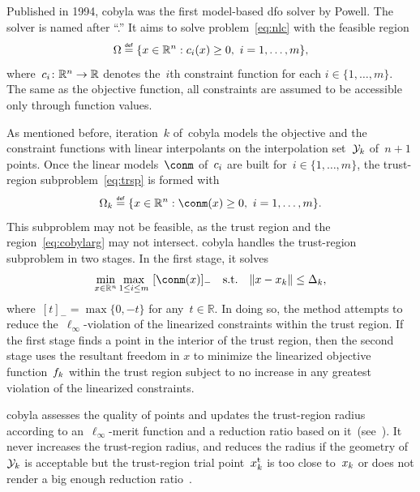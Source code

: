 \documentclass[
    smallextended,  %
    final,          %
]{svjour3}
\newcommand{\norm}[2][]{#1\lVert#2#1\rVert}
\newcommand{\set}[2][]{#1\{#2#1\}}
\newcommand{\R}{\mathbb{R}}
\newcommand{\st}{\text{s.t.}}
\newcommand{\trust}{{\text{t}}}
\newcommand{\con}[1][i]{c\ifthenelse{\equal{#1}{}}{}{_{#1}}}
\newcommand{\eqdef}{\stackrel{\mathsmaller{\mathsf{def}}}{=}}
\newcommand{\fsetm}[1][k]{\Omega_{#1}}
\newcommand{\fset}{\Omega}
\newcommand{\iter}[1][k]{x\ifthenelse{\equal{#1}{}}{}{_{#1}}}
\newcommand{\objm}[1][k]{\obj\ifthenelse{\equal{#1}{}}{}{_{#1}}}
\newcommand{\obj}{f}
\newcommand{\rad}[1][k]{\Delta\ifthenelse{\equal{#1}{}}{}{_{#1}}}
\newcommand{\xpt}[1][k]{\mathcal{Y}\ifthenelse{\equal{#1}{}}{}{_{#1}}}
\begin{document}
Published in 1994, \gls{cobyla} was the first model-based \gls{dfo} solver by Powell.
The solver is named after ``.''
It aims to solve problem~\eqref{eq:nlc} with the feasible region
\begin{equation*}
    \fset \eqdef \set{x \in \R^n : \con(x) \ge 0, ~ i = 1, \dots, m},
\end{equation*}
where~$\con \colon \R^n \to \R$ denotes the~$i$th constraint function for each $i \in \set{1, \dots, m}$.
The same as the objective function, all constraints are assumed to be accessible only through function values.

As mentioned before, iteration~$k$ of~\gls{cobyla} models the objective and the constraint functions with linear interpolants on the interpolation set~$\xpt$ of~$n + 1$ points.
Once the linear models~$\conm$ of~$\con$ are built for~$i \in \set{1, \dots, m}$, the trust-region subproblem~\eqref{eq:trsp} is formed with
\begin{equation}
    \label{eq:cobylarg}
    \fsetm \eqdef \set{x \in \R^n : \conm(x) \ge 0, ~ i=1, \dots, m}.
\end{equation}
This subproblem may not be feasible, as the trust region and the region~\eqref{eq:cobylarg} may not intersect.
\Gls{cobyla} handles the trust-region subproblem in two stages.
In the first stage, it solves
\begin{equation*}
    \min_{x \in \R^n} \max_{1 \le i \le m} ~ [\conm(x)]_{-} \quad \st \quad \norm{x - \iter} \le \rad,
\end{equation*}
where~$[t]_{-} = \max \set{0, -t}$ for any~$t\in \R$.
In doing so, the method attempts to reduce the~$\ell_{\infty}$-violation of the linearized constraints within the trust region.
If the first stage finds a point in the interior of the trust region, then the second stage uses the resultant freedom in $x$ to minimize the linearized objective function~$\objm$ within the trust region subject to no increase in any greatest violation of the linearized constraints.

\Gls{cobyla} assesses the quality of points and updates the trust-region radius according to an~$\ell_\infty$-merit function and a reduction ratio based on it~(see~\cite[Equations~(5),~(9), and~(10)]{Powell_1994}).
It never increases the trust-region radius, and reduces the radius if the geometry of~$\xpt$ is acceptable but the trust-region trial point~$\iter^\trust$ is too close to~$\iter$ or does not render a big enough reduction ratio~\cite[Equation~(11)]{Powell_1994}.
\end{document}

